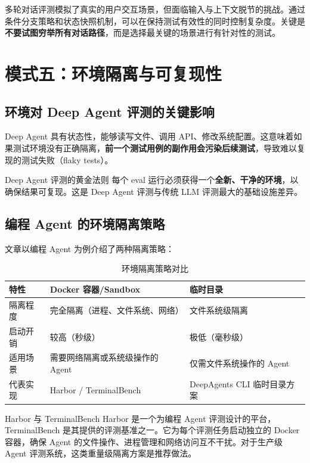 \documentclass[a4paper]{article}
\begin{document}
多轮对话评测模拟了真实的用户交互场景，但面临输入与上下文脱节的挑战。通过条件分支策略和状态快照机制，可以在保持测试有效性的同时控制复杂度。关键是\textbf{不要试图穷举所有对话路径}，而是选择最关键的场景进行有针对性的测试。


\section{模式五：环境隔离与可复现性}

\subsection{环境对 Deep Agent 评测的关键影响}

Deep Agent 具有状态性，能够读写文件、调用 API、修改系统配置。这意味着如果测试环境没有正确隔离，\textbf{前一个测试用例的副作用会污染后续测试}，导致难以复现的测试失败（flaky tests）。

\begin{importantbox}{Deep Agent 评测的黄金法则}
每个 eval 运行必须获得一个\textbf{全新、干净的环境}，以确保结果可复现。这是 Deep Agent 评测与传统 LLM 评测最大的基础设施差异。
\end{importantbox}

\subsection{编程 Agent 的环境隔离策略}

文章以编程 Agent 为例介绍了两种隔离策略：

\begin{table}[H]
\centering
\caption{环境隔离策略对比}
\begin{tabular}{lp{4.5cm}p{4.5cm}}
\toprule
\textbf{特性} & \textbf{Docker 容器/Sandbox} & \textbf{临时目录} \\
\midrule
隔离程度 & 完全隔离（进程、文件系统、网络） & 文件系统级隔离 \\
启动开销 & 较高（秒级） & 极低（毫秒级） \\
适用场景 & 需要网络隔离或系统级操作的 Agent & 仅需文件系统操作的 Agent \\
代表实现 & Harbor / TerminalBench & DeepAgents CLI 临时目录方案 \\
\bottomrule
\end{tabular}
\end{table}

\begin{knowledgebox}{Harbor 与 TerminalBench}
Harbor 是一个为编程 Agent 评测设计的平台，TerminalBench 是其提供的评测基准之一。它为每个评测任务启动独立的 Docker 容器，确保 Agent 的文件操作、进程管理和网络访问互不干扰。对于生产级 Agent 评测系统，这类重量级隔离方案是推荐做法。
\end{knowledgebox}
\end{document}
